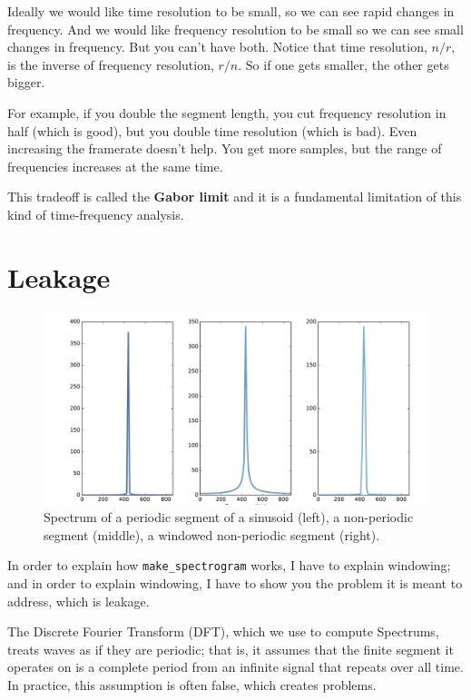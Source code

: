 \documentclass[12pt]{book}
\begin{document}
Ideally we would like time resolution to be small, so we can see rapid
changes in frequency.  And we would like frequency resolution to be
small so we can see small changes in frequency.  But you can't have
both.  Notice that time resolution, $n/r$, is the inverse of frequency
resolution, $r/n$.  So if one gets smaller, the other gets bigger.

For example, if you double the segment length, you cut frequency
resolution in half (which is good), but you double time resolution
(which is bad).  Even increasing the framerate doesn't help.  You get
more samples, but the range of frequencies increases at
the same time.

This tradeoff is called the {\bf Gabor limit} and it is a fundamental
limitation of this kind of time-frequency analysis.


\section{Leakage}

\begin{figure}
\centerline{\includegraphics[width=5.5in]{figs/windowing1.pdf}}
\caption{Spectrum of a periodic segment of a sinusoid (left), a
  non-periodic segment (middle), a windowed non-periodic segment
  (right).}
\label{fig.windowing1}
\end{figure}

In order to explain how \verb"make_spectrogram" works, I have
to explain windowing; and in order to explain windowing, I have to
show you the problem it is meant to address, which is leakage.

The Discrete Fourier Transform (DFT), which we use to compute
Spectrums, treats waves as if they are periodic; that is, it assumes
that the finite segment it operates on is a complete period from an
infinite signal that repeats over all time.  In practice, this
assumption is often false, which creates problems.
\end{document}
